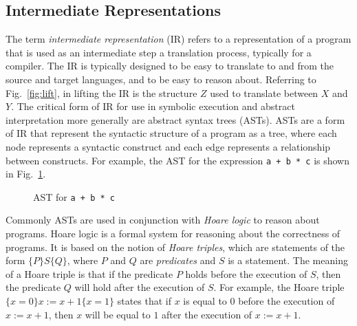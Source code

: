 \subsection{Intermediate Representations}

The term \emph{intermediate representation} (IR) refers to a representation of a program that is used as an intermediate step a translation process, typically for a compiler.
The IR is typically designed to be easy to translate to and from the source and target languages, and to be easy to reason about.
Referring to Fig.~\ref{fig:lift}, in lifting the IR is the structure $Z$ used to translate between $X$ and $Y$.
The critical form of IR for use in symbolic execution and abstract interpretation more generally are abstract syntax trees (ASTs).
ASTs are a form of IR that represent the syntactic structure of a program as a tree, where each node represents a syntactic construct and each edge represents a relationship between constructs.
For example, the AST for the expression \texttt{a + b * c} is shown in Fig.~\ref{fig:ast}.

\begin{figure}[h]
\centering
{}
\caption{AST for \texttt{a + b * c}}
\label{fig:ast}
\end{figure}

Commonly ASTs are used in conjunction with \emph{Hoare logic} to reason about programs.
Hoare logic is a formal system for reasoning about the correctness of programs.
It is based on the notion of \emph{Hoare triples}, which are statements of the form $\{P\} S \{Q\}$, where $P$ and $Q$ are \emph{predicates} and $S$ is a statement.
The meaning of a Hoare triple is that if the predicate $P$ holds before the execution of $S$, then the predicate $Q$ will hold after the execution of $S$.
For example, the Hoare triple $\{x = 0\} x := x + 1 \{x = 1\}$ states that if $x$ is equal to $0$ before the execution of $x := x + 1$, then $x$ will be equal to $1$ after the execution of $x := x + 1$.


